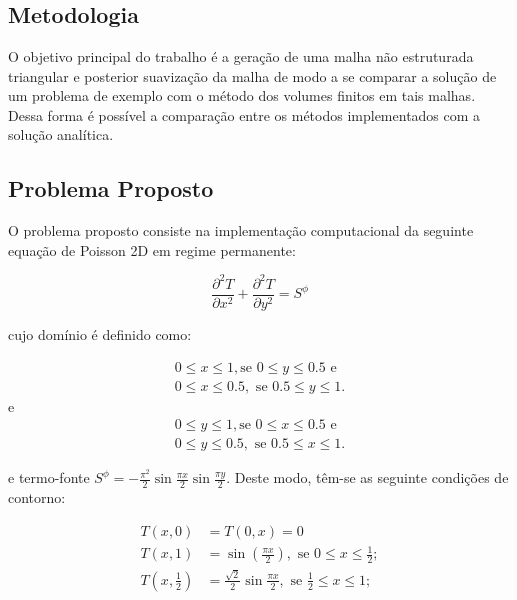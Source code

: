 \chapter[DESENVOLVIMENTO]{}

\section{Metodologia}
O objetivo principal do trabalho é a geração de uma malha não estruturada triangular e posterior suavização da malha de modo a se comparar a solução de um problema de exemplo com o método dos volumes finitos em tais malhas. Dessa forma é possível a comparação entre os métodos implementados com a solução analítica.

\section{Problema Proposto}

O problema proposto consiste na implementação computacional da seguinte equação de Poisson 2D em regime permanente:

\begin{equation*}
    \frac{\partial^2 T}{\partial x^2} + \frac{\partial^2 T}{\partial y^2} = S^\phi
\end{equation*}

cujo domínio é definido como:

\begin{equation*}
\begin{split}
    0\leq x \leq 1, \text{se } 0 \leq y \leq 0.5 \text{ e}\\
    0 \leq x \leq 0.5, \text{ se } 0.5 \leq y \leq 1.
\end{split}
\end{equation*}
e
\begin{equation*}
\begin{split}
    0\leq y \leq 1, \text{se } 0 \leq x \leq 0.5 \text{ e}\\
    0 \leq y \leq 0.5, \text{ se } 0.5 \leq x \leq 1.
\end{split}
\end{equation*}

e termo-fonte $S^\phi = -\frac{\pi^2}{2}\sin{\frac{\pi x}{2}}\sin{\frac{\pi y}{2}}$. Deste modo, têm-se as seguinte condições de contorno:

\begin{equation*}
\begin{split}
    T(x,0)&=T(0,x)=0\\
    T(x,1)&=\sin(\frac{\pi x}{2}), \text{ se } 0 \leq x \leq \frac{1}{2};\\
    T(x,\frac{1}{2})&=\frac{\sqrt{2}}{2} \sin{\frac{\pi x}{2}}, \text{ se } \frac{1}{2} \leq x \leq 1;
\end{split}
\end{equation*}

